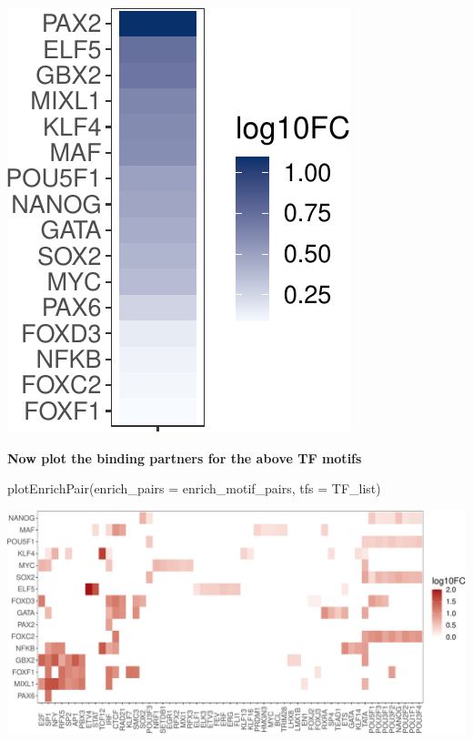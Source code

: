 \documentclass[
]{article}
\newenvironment{Shaded}{}{}
\newcommand{\AttributeTok}[1]{\textcolor[rgb]{0.49,0.56,0.16}{#1}}
\newcommand{\FunctionTok}[1]{\textcolor[rgb]{0.02,0.16,0.49}{#1}}
\newcommand{\NormalTok}[1]{#1}
\begin{document}
\includegraphics{enrichmotifpairR_user_manual_guide_files/figure-latex/Th17_treated_vs_untreated_4-1.pdf}

\textbf{Now plot the binding partners for the above TF motifs}

\begin{Shaded}
\begin{Highlighting}[]

\FunctionTok{plotEnrichPair}\NormalTok{(}\AttributeTok{enrich\_pairs =}\NormalTok{ enrich\_motif\_pairs,}
               \AttributeTok{tfs =}\NormalTok{ TF\_list)}
\end{Highlighting}
\end{Shaded}

\includegraphics{enrichmotifpairR_user_manual_guide_files/figure-latex/Th17_treated_vs_untreated_5-1.pdf}
\end{document}
